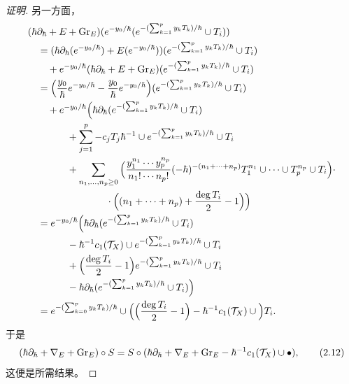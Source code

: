 \begin{proof}[证明]
另一方面，
\begin{align*}
&(\hbar\partial_\hbar+E+\mathrm{Gr}_E)(e^{-y_0/\hbar}(e^{-(\sum_{k=1}^p y_kT_k)/\hbar}\cup T_i))\\
&\quad=(\hbar\partial_\hbar(e^{-y_0/\hbar})+E(e^{-y_0/\hbar}))(e^{-(\sum_{k=1}^p y_kT_k)/\hbar}\cup T_i)\\
&\qquad+e^{-y_0/\hbar}(\hbar\partial_\hbar+E+\mathrm{Gr}_E)(e^{-(\sum_{k=1}^p y_kT_k)/\hbar}\cup T_i)\\
&\quad=\Big(\frac{y_0}{\hbar}e^{-y_0/\hbar}-\frac{y_0}{\hbar}e^{-y_0/\hbar}\Big)(e^{-(\sum_{k=1}^p y_kT_k)/\hbar}\cup T_i)\\
&\qquad+e^{-y_0/\hbar}\Big(\hbar\partial_\hbar(e^{-(\sum_{k=1}^p y_kT_k)/\hbar}\cup T_i)\\
&\qquad\qquad+\sum_{j=1}^p-c_jT_j\hbar^{-1}\cup e^{-(\sum_{k=1}^p y_kT_k)/\hbar}\cup T_i\\
&\qquad\qquad+\sum_{n_1,\dots,n_p\ge0}\Big(\frac{y_1^{n_1}\cdots y_p^{n_p}}{n_1!\cdots n_p!}(-\hbar)^{-(n_1+\cdots+n_p)}T_1^{n_1}\cup\cdots\cup T_p^{n_p}\cup T_i\Big)\cdot\\
&\qquad\qquad\qquad\qquad\cdot\Big((n_1+\cdots+n_p)+\frac{\deg T_i}{2}-1\Big)\Big)\\
&\quad=e^{-y_0/\hbar}\Big(\hbar\partial_\hbar(e^{-(\sum_{k=1}^p y_kT_k)/\hbar}\cup T_i)\\
&\qquad\qquad-\hbar^{-1}c_1(\mathcal{T}_X)\cup e^{-(\sum_{k=1}^p y_kT_k)/\hbar}\cup T_i\\
&\qquad\qquad+\Big(\frac{\deg T_i}{2}-1\Big)e^{-(\sum_{k=1}^p y_kT_k)/\hbar}\cup T_i\\
&\qquad\qquad-\hbar\partial_\hbar(e^{-(\sum_{k=1}^p y_kT_k)/\hbar}\cup T_i)\Big)\\
&\quad=e^{-(\sum_{k=0}^p y_kT_k)/\hbar}\cup\Big(\Big(\frac{\deg T_i}{2}-1\Big)-\hbar^{-1}c_1(\mathcal{T}_X)\cup\Big)T_i.
\end{align*}
于是
\begin{equation}
(\hbar\partial_\hbar+\nabla_E+\mathrm{Gr}_E)\circ S=S\circ(\hbar\partial_\hbar+\nabla_E+\mathrm{Gr}_E-\hbar^{-1}c_1(\mathcal{T}_X)\cup\bullet), \tag{2.12}
\end{equation}
这便是所需结果。
\end{proof}


